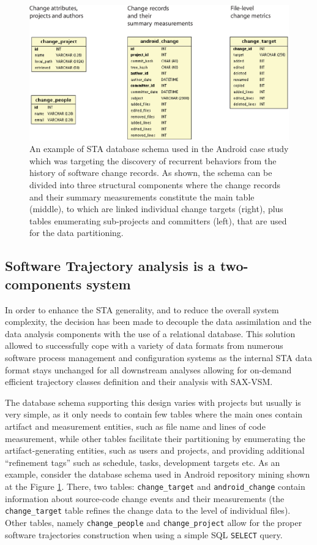 \begin{figure}[t]
   \centering
   \includegraphics[width=150mm]{figures/sta-schema.eps}
   \caption{An example of STA database schema used in the Android case study which was targeting the discovery of
   recurrent behaviors from the history of software change records. As shown, the schema can be divided into three 
   structural components where the change records and their summary measurements constitute the main table (middle),
   to which are linked individual change targets (right), 
   plus tables enumerating sub-projects and committers (left), that are used for the data partitioning.}
   \label{fig:db-schema}
\end{figure}

\subsection{Software Trajectory analysis is a two-components system}
In order to enhance the STA generality, and to reduce the overall system complexity, the decision has been made to 
decouple the data assimilation and the data analysis components with the use of a relational database. 
This solution allowed to successfully cope with a variety of data formats from numerous software process management and 
configuration systems as the internal STA data format stays unchanged for all downstream analyses allowing for on-demand 
efficient trajectory classes definition and their analysis with \mbox{SAX-VSM}. 

The database schema supporting this design varies with projects but usually is very simple, as it only needs to contain 
few tables where the main ones contain artifact and measurement entities, such as file name and lines of code measurement, 
while other tables facilitate their partitioning by enumerating the artifact-generating entities, such as users and projects, 
and providing additional ``refinement tags'' such as schedule, tasks, development targets etc.
As an example, consider the database schema used in Android repository mining shown at the Figure \ref{fig:db-schema}. 
There, two tables: \texttt{change\_target} and \texttt{android\_change} contain information about source-code change events
and their measurements (the \texttt{change\_target} table refines the change data to the level of individual files). Other tables,
namely \texttt{change\_people} and \texttt{change\_project} allow for the proper software trajectories construction when using 
a simple SQL \texttt{SELECT} query. 

